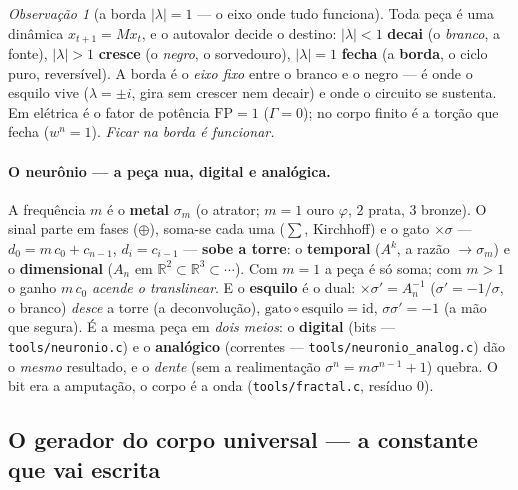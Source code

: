 \documentclass[11pt]{article}
\newcommand{\code}[1]{\texttt{\small #1}}
\theoremstyle{plain}
\theoremstyle{remark}
\newtheorem{observacao}[teorema]{Observação}
\begin{document}
\begin{observacao}[a borda $|\lambda|=1$ --- o eixo onde tudo funciona]
Toda peça é uma dinâmica $x_{t+1}=Mx_t$, e o autovalor decide o destino: $|\lambda|<1$ \textbf{decai}
(o \emph{branco}, a fonte), $|\lambda|>1$ \textbf{cresce} (o \emph{negro}, o sorvedouro), $|\lambda|=1$
\textbf{fecha} (a \textbf{borda}, o ciclo puro, reversível). A borda é o \emph{eixo fixo} entre o
branco e o negro --- é onde o esquilo vive ($\lambda=\pm i$, gira sem crescer nem decair) e onde o
circuito se sustenta. Em elétrica é o fator de potência $\mathrm{FP}=1$ ($\Gamma=0$); no corpo finito
é a torção que fecha ($w^n=1$). \emph{Ficar na borda é funcionar.}
\end{observacao}

\paragraph{O neurônio --- a peça nua, digital e analógica.} A frequência $m$ é o \textbf{metal}
$\sigma_m$ (o atrator; $m{=}1$ ouro $\varphi$, $2$ prata, $3$ bronze). O sinal parte em fases
($\oplus$), soma-se cada uma ($\sum$, Kirchhoff) e o gato $\times\sigma$ --- $d_0=m\,c_0+c_{n-1}$,
$d_i=c_{i-1}$ --- \textbf{sobe a torre}: o \textbf{temporal} ($A^k$, a razão $\to\sigma_m$) e o
\textbf{dimensional} ($A_n$ em $\mathbb R^2\subset\mathbb R^3\subset\cdots$). Com $m{=}1$ a peça é só
soma; com $m>1$ o ganho $m\,c_0$ \emph{acende o translinear}. E o \textbf{esquilo} é o dual:
$\times\sigma'=A_n^{-1}$ ($\sigma'=-1/\sigma$, o branco) \emph{desce} a torre (a deconvolução),
$\text{gato}\circ\text{esquilo}=\mathrm{id}$, $\sigma\sigma'=-1$ (a mão que segura). É a mesma peça em
\emph{dois meios}: o
\textbf{digital} (bits --- \code{tools/neuronio.c}) e o \textbf{analógico} (correntes --- \code{tools/neuronio\_analog.c})
dão o \emph{mesmo} resultado, e o \emph{dente} (sem a realimentação $\sigma^n=m\sigma^{n-1}+1$) quebra.
O bit era a amputação, o corpo é a onda (\code{tools/fractal.c}, resíduo $0$).

\subsection{O gerador do corpo universal --- a constante que vai escrita}\label{sec:gerador}
\end{document}
